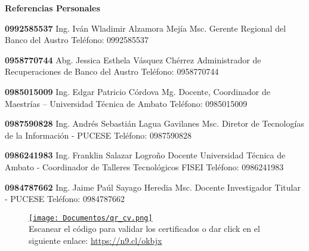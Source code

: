\pagestyle{empty}
\begin{mainbar}
    \textbf{Referencias Personales}
\end{mainbar}


\begin{devent}
    \cvevent
	{\textbf{0992585537}}
	{Ing. Iván Wladimir Alzamora Mejía Msc.}
	{Gerente Regional del Banco del Austro}
	{Teléfono: 0992585537}
	{}
\end{devent}

\begin{levent}
    \cvevent
	{\textbf{0958770744}}
	{Abg. Jessica Esthela Vásquez Chérrez}
	{Administrador de Recuperaciones de Banco del Austro }
	{Teléfono: 0958770744}
	{}
\end{levent}


\begin{devent}
    \cvevent
	{\textbf{0985015009}}
	{Ing. Edgar Patricio Córdova Mg.}
	{Docente, Coordinador de Maestrías – Universidad Técnica de Ambato}
	{Teléfono: 0985015009}
	{}
\end{devent}

\begin{levent}
    \cvevent
	{\textbf{0987590828}}
	{Ing. Andrés Sebastián Lagua Gavilanes Msc.}
	{Diretor de Tecnologías de la Información - PUCESE}
	{Teléfono: 0987590828}
	{}
\end{levent}



\begin{devent}
    \cvevent
	{\textbf{0986241983}}
	{Ing. Franklin Salazar Logroño}
	{Docente Universidad Técnica de Ambato - Coordinador de Talleres Tecnológicos FISEI}
	{Teléfono: 0986241983}
	{}
\end{devent}




\begin{levent}
    \cvevent
	{\textbf{0984787662}}
	{Ing. Jaime Paúl Sayago Heredia Msc.}
	{Docente Investigador Titular - PUCESE}
	{Teléfono: 0984787662}
	{}
\end{levent}

\begin{figure}[h]
    \centering
    \href{https://puceseedu-my.sharepoint.com/:b:/g/personal/homero_j_velastegui_i_pucese_edu_ec/Ed01ebVfgyxCt_lZrprxfVQBDFxuOlYQafqRMlXky1HdYQ?e=j38trF}{\texttt{[image: Documentos/qr\_cv.png]}}
    \\Escanear el código para validar los certificados o dar click en el siguiente enlace: \href{https://n9.cl/okbjx}{https://n9.cl/okbjx} 
\end{figure}


